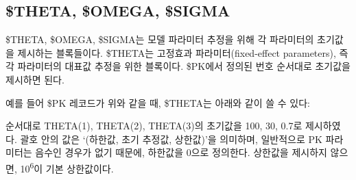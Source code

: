 \documentclass[
  11pt,
  krantz2,
  a4paper]{krantz}
\newenvironment{Shaded}{\begin{snugshade}}{\end{snugshade}}
\newcommand{\DecValTok}[1]{\textcolor[rgb]{0.00,0.00,0.81}{#1}}
\newcommand{\FloatTok}[1]{\textcolor[rgb]{0.00,0.00,0.81}{#1}}
\newcommand{\KeywordTok}[1]{\textcolor[rgb]{0.13,0.29,0.53}{\textbf{#1}}}
\newcommand{\NormalTok}[1]{#1}
\newcommand{\OperatorTok}[1]{\textcolor[rgb]{0.81,0.36,0.00}{\textbf{#1}}}
\newcommand{\StringTok}[1]{\textcolor[rgb]{0.31,0.60,0.02}{#1}}
\theoremstyle{definition}
\theoremstyle{definition}
\theoremstyle{definition}
\theoremstyle{remark}
\begin{document}
\hypertarget{theta-omega-sigma}{%
\subsection{\$THETA, \$OMEGA, \$SIGMA}\label{theta-omega-sigma}}


\$THETA, \$OMEGA, \$SIGMA는 모델 파라미터 추정을 위해 각 파라미터의 초기값을 제시하는 블록들이다. \$THETA는 고정효과 파라미터(fixed-effect parameters), 즉 각 파라미터의 대표값 추정을 위한 블록이다. \$PK에서 정의된 번호 순서대로 초기값을 제시하면 된다.

\begin{Shaded}
\end{Shaded}

예를 들어 \$PK 레코드가 위와 같을 때, \$THETA는 아래와 같이 쓸 수 있다:

\begin{Shaded}
\end{Shaded}

순서대로 THETA(1), THETA(2), THETA(3)의 초기값을 100, 30, 0.7로 제시하였다. 괄호 안의 값은 `(하한값, 초기 추정값, 상한값)'을 의미하며, 일반적으로 PK 파라미터는 음수인 경우가 없기 때문에, 하한값을 0으로 정의한다. 상한값을 제시하지 않으면, 10\textsuperscript{6}이 기본 상한값이다.
\end{document}
